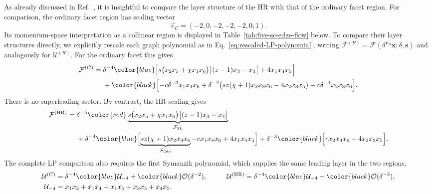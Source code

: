 \documentclass[a4paper,11pt]{article}
\newcommand{\x}{\boldsymbol{x}}
\newcommand{\s}{\boldsymbol{s}}
\newcommand{\HR}{\mathrm{HR}}
\newcommand{\FSL}{\mathcal F_{\rm SL}}
\newcommand{\FObs}{\mathcal F_{\rm Obs}}
\newcommand{\SLcolour}[1]{{\color{red}#1}}
\newcommand{\HRcolour}[1]{{\color{blue}#1}}
\newcommand{\Othercolour}[1]{{\color{black}#1}}
\begin{document}
As already discussed in Ref.~\cite{Chen:2026dnj}, it is insightful to compare
the layer structure of the HR with that of the ordinary facet region.
For comparison, the ordinary facet region has scaling vector
\begin{equation}
 \vec v_C=(-2,0,-2,-2,-2,0;1).
 \label{eq:five-facet-vector}
\end{equation}
Its momentum-space interpretation as a collinear region is displayed in
Table~\ref{tab:five-sc-edge-flow} below.
To compare their layer structures directly, we explicitly rescale each graph
polynomial as in Eq.~\eqref{eq:rescaled-LP-polynomial}, writing
\(\mathcal F^{(R)}=\mathcal F(\delta^{\boldsymbol v_R}\x;\delta,\s)\)
and analogously for \(\mathcal U^{(R)}\).  For the ordinary facet this gives
\begin{equation}
 \begin{aligned}
 \mathcal F^{(C)}={}&
 \delta^{-4}\HRcolour{\Bigl[
  s\bigl(x_2x_5+\chi x_1x_6\bigr)
   \bigl[(z-1)x_3-x_4\bigr]+4x_1x_4x_5\Bigr]}\\
 &+\Othercolour{\Bigl[-c\delta^{-3}x_1x_4x_6
  +\delta^{-2}\bigl(sz(\chi+1)x_2x_3x_6-4x_2x_3x_5\bigr)
  +c\delta^{-1}x_2x_3x_6\Bigr]}.
 \end{aligned}
 \label{eq:five-facet-polynomial}
\end{equation}
There is no superleading sector.  By contrast, the HR scaling gives
\begin{equation}
 \begin{aligned}
 \mathcal F^{(\HR)}={}&
 \delta^{-5}\SLcolour{\underbrace{
  s\bigl(x_2x_5+\chi x_1x_6\bigr)
   \bigl[(z-1)x_3-x_4\bigr]}_{\FSL}}\\
 &+\delta^{-4}\HRcolour{\Bigl[
   \underbrace{sz(\chi+1)x_2x_3x_6}_{\FObs}
   -cx_1x_4x_6+4x_1x_4x_5\Bigr]}
 +\delta^{-3}\Othercolour{\Bigl[
   cx_2x_3x_6-4x_2x_3x_5\Bigr]}.
 \end{aligned}
 \label{eq:five-HR-polynomial}
\end{equation}
The complete LP comparison also requires the first Symanzik polynomial, which
supplies the same leading layer in the two regions,
\begin{equation}
 \begin{aligned}
 \mathcal U^{(C)}&=\delta^{-4}\HRcolour{\mathcal U_{-4}}
                  +\Othercolour{\mathcal O(\delta^{-2})},
 &\qquad
 \mathcal U^{(\HR)}&=\delta^{-4}\HRcolour{\mathcal U_{-4}}
                  +\Othercolour{\mathcal O(\delta^{-3})},\\
 \mathcal U_{-4}&=x_1x_3+x_1x_4+x_1x_5+x_3x_5+x_4x_5.
 \end{aligned}
 \label{eq:five-U-leading}
\end{equation}
\end{document}
